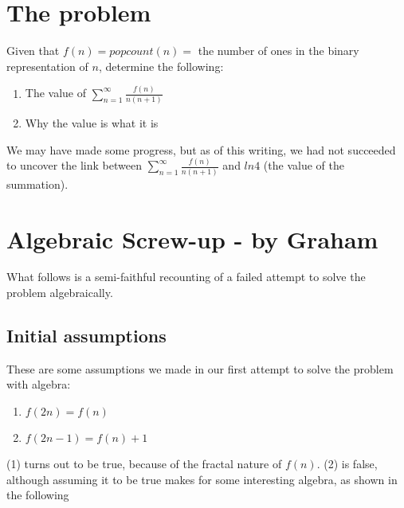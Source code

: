 \documentclass{article}
\begin{document}

\section{The problem}
Given that $f(n)=popcount(n)=$ the number of ones in the binary representation of $n$, determine the following:

\begin{enumerate}
    \item The value of $\sum_{n=1}^\infty \frac{f(n)}{n(n+1)}$
    \item Why the value is what it is
\end{enumerate}

We may have made some progress, but as of this writing, we had not succeeded to uncover the link between $\sum_{n=1}^\infty \frac{f(n)}{n(n+1)}$ and $ln4$ (the value of the summation).

\section{Algebraic Screw-up - by Graham}
What follows is a semi-faithful recounting of a failed attempt to solve the problem algebraically.
\subsection{Initial assumptions}
These are some assumptions we made in our first attempt to solve the problem with algebra:
\begin{enumerate}
    \item $f(2n) = f(n)$
    \item $f(2n-1) = f(n) + 1$
\end{enumerate}

(1) turns out to be true, because of the fractal nature of $f(n)$.
(2) is false, although assuming it to be true makes for some interesting algebra, as shown in the following\\
\end{document}
